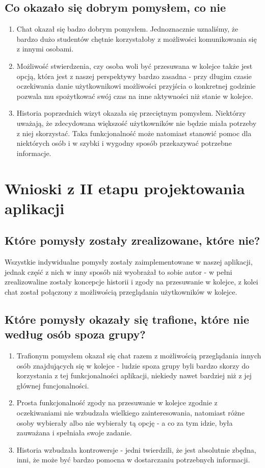 \documentclass[12pt]{article}
\begin{document}
\subsection{Co okazało się dobrym pomysłem, co nie}
\begin {enumerate}
	\item Chat okazał się badzo dobrym pomysłem. Jednoznacznie uznaliśmy, że bardzo dużo studentów chętnie korzystałoby z możliwości komunikowania się z innymi osobami.
	
	\item Możliwość stwierdzenia, czy osoba woli być przesuwana w kolejce także jest opcją, która jest z naszej perspektywy bardzo zasadna - przy długim czasie oczekiwania danie użytkownikowi możliwości przyjścia o konkretnej godzinie pozwala mu spożytkować swój czas na inne aktywności niż stanie w kolejce.
	
	\item Historia poprzednich wizyt okazała się przeciętnym pomysłem. Niektórzy uważają, że zdecydowana większość użytkowników nie będzie miała potrzeby z niej skorzystać. Taka funkcjonalność może natomiast stanowić pomoc dla niektórych osób i w szybki i wygodny sposób przekazywać potrzebne informacje.
	
\end {enumerate}

\section {Wnioski z II etapu projektowania aplikacji}
\subsection {Które pomysły zostały zrealizowane, które nie?}

Wszystkie indywidualne pomysły zostały zaimplementowane w naszej aplikacji, jednak część z nich w inny sposób niż wyobrażał to sobie autor - w pełni zrealizowaline zostały koncepcje historii i zgody na przesuwanie w kolejce, z kolei chat został połączony z możliwością przeglądania użytkowników w kolejce.

\subsection{Które pomysły okazały się trafione, które nie według osób spoza grupy?}
\begin{enumerate}
	\item Trafionym pomysłem okazał się chat razem z możliwością przeglądania innych osób znajdujących się w kolejce - ludzie spoza grupy byli bardzo skorzy do korzystania z tej funkcjonalności aplikacji, niekiedy nawet bardziej niż z jej głównej funcjonalności.
	\item Prosta funkcjonalność zgody na przesuwanie w kolejce zgodnie z oczekiwaniami nie wzbudzała wielkiego zainteresowania, natomiast różne osoby wybierały albo nie wybierały tą opcję - a co za tym idzie, była zauważana i spełniała swoje zadanie.
	\item Historia wzbudzała kontrowersje - jedni twierdzili, że jest absolutnie zbędna, inni, że może być bardzo pomocna w dostarczaniu potrzebnych informacji.
\end{enumerate}
\end{document}
